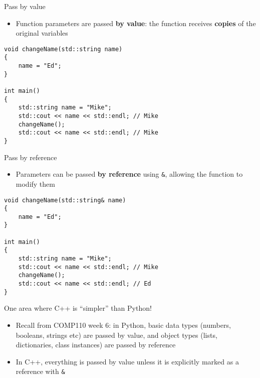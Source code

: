 \begin{frame}[fragile]{Pass by value}
    \begin{itemize}
        \item Function parameters are passed \textbf{by value}:
        the function receives \textbf{copies} of the original variables
    \end{itemize}
    \pause
    \begin{lstlisting}
void changeName(std::string name)
{
    name = "Ed";
}

int main()
{
    std::string name = "Mike";
    std::cout << name << std::endl; // Mike
    changeName();
    std::cout << name << std::endl; // Mike
}
    \end{lstlisting}
\end{frame}

\begin{frame}[fragile]{Pass by reference}
    \begin{itemize}
        \item Parameters can be passed \textbf{by reference} using \lstinline{&}, allowing the function to modify them
    \end{itemize}
    \pause
    \begin{lstlisting}
void changeName(std::string& name)
{
    name = "Ed";
}

int main()
{
    std::string name = "Mike";
    std::cout << name << std::endl; // Mike
    changeName();
    std::cout << name << std::endl; // Ed
}
    \end{lstlisting}
\end{frame}

\begin{frame}[fragile]{One area where C++ is ``simpler'' than Python!}
    \begin{itemize}
        \item Recall from COMP110 week 6: in Python, basic data types (numbers, booleans, strings etc)
            are passed by value, and object types (lists, dictionaries, class instances) are passed by reference
        \pause
        \item In C++, everything is passed by value unless it is explicitly marked as a reference with \lstinline{&}
    \end{itemize}
\end{frame}

